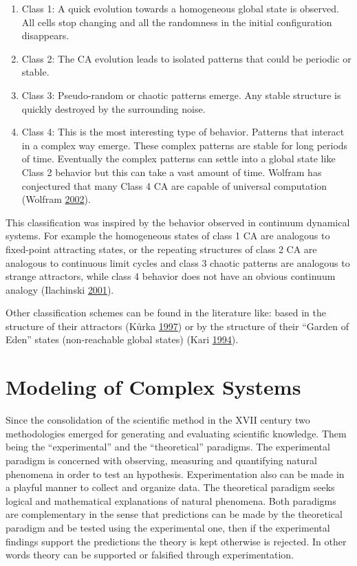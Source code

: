 \documentclass[
]{book}
\begin{document}
\begin{enumerate}
\def\labelenumi{\arabic{enumi}.}
\item
  Class 1: A quick evolution towards a homogeneous global state is observed. All cells stop changing and all the randomness in the initial configuration disappears.
\item
  Class 2: The CA evolution leads to isolated patterns that could be periodic or stable.
\item
  Class 3: Pseudo-random or chaotic patterns emerge. Any stable structure is quickly destroyed by the surrounding noise.
\item
  Class 4: This is the most interesting type of behavior. Patterns that interact in a complex way emerge. These complex patterns are stable for long periods of time. Eventually the complex patterns can settle into a global state like Class 2 behavior but this can take a vast amount of time. Wolfram has conjectured that many Class 4
  CA are capable of universal computation (Wolfram \protect\hyperlink{ref-wolfram2002new}{2002}).
\end{enumerate}

This classification was inspired by the behavior observed in continuum dynamical systems. For example the homogeneous states of class 1 CA are analogous to fixed-point attracting states, or the repeating structures of class 2 CA are analogous to continuous limit cycles and class 3 chaotic patterns are analogous to strange attractors, while class 4 behavior does not have an obvious continuum analogy (Ilachinski \protect\hyperlink{ref-ilachinski2001cellular}{2001}).

Other classification schemes can be found in the literature like: based in the structure of their attractors (Kůrka \protect\hyperlink{ref-kuurka1997languages}{1997}) or by the structure of their ``Garden of Eden'' states (non-reachable global states) (Kari \protect\hyperlink{ref-kari1994reversibility}{1994}).

\hypertarget{modeling-of-complex-systems}{%
\section{Modeling of Complex Systems}\label{modeling-of-complex-systems}}

Since the consolidation of the scientific method in the XVII century two methodologies emerged for generating and evaluating scientific knowledge. Them being the ``experimental'' and the ``theoretical'' paradigms. The experimental paradigm is concerned with observing, measuring and quantifying natural phenomena in order to test an hypothesis. Experimentation also can be made in a playful manner to collect and organize data. The theoretical paradigm seeks logical and mathematical explanations of natural phenomena. Both paradigms are complementary in the sense that predictions can be made by the theoretical paradigm and be tested using the experimental one, then if the experimental findings support the predictions the theory is kept otherwise is rejected. In other words theory can be supported or falsified through experimentation.
\end{document}
